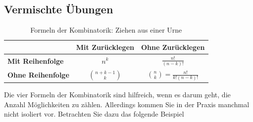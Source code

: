 \clearpage

\subsection{Vermischte Übungen}

\begin{table}[ht]
    \centering
    \begin{tabular}{@{}lcc@{}}
        \toprule
        \textbf{}                 & \textbf{Mit Zurücklegen} & \textbf{Ohne Zurücklegen}                \\ \midrule
        \textbf{Mit Reihenfolge}  & \( n^k \)                & \( \frac{n!}{(n-k)!} \)                  \\
        \textbf{Ohne Reihenfolge} & \( \binom{n+k-1}{k} \)   & \( \binom{n}{k} = \frac{n!}{k!(n-k)!} \) \\ \bottomrule
    \end{tabular}
    \caption{Formeln der Kombinatorik: Ziehen aus einer Urne}
    \label{tab:urnenformeln}
\end{table}

Die vier Formeln der Kombinatorik sind hilfreich, wenn es darum geht, die Anzahl Möglichkeiten zu zählen. Allerdings kommen Sie in der Praxis manchmal nicht isoliert vor. Betrachten Sie dazu das folgende Beispiel

